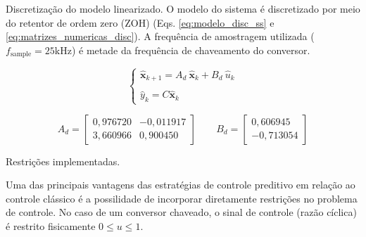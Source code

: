 \documentclass[xcolor=dvipsnames,aspectratio=169]{beamer}
\begin{document}
\begin{frame}{Discretização do modelo linearizado.}
    O modelo do sistema é discretizado por meio do retentor de ordem zero (ZOH) (Eqs. \eqref{eq:modelo_disc_ss} e \eqref{eq:matrizes_numericas_disc}). A frequência de amostragem utilizada (\(f_\mathrm{sample} = 25 \text{kHz}\)) é metade da frequência de chaveamento do conversor.

    \begin{equation}
        \begin{cases}
            \mathbf{\hat{x}}_{k+1} = A_d \ \mathbf{\hat{x}}_k + B_d \  \hat{u}_k \\ \\
            \hat{y}_k = C \mathbf{\hat{x}}_k
        \end{cases}
        \label{eq:modelo_disc_ss}
    \end{equation}

    \begin{equation}
        A_d =
        \begin{bmatrix}
            0,976720 & -0,011917 \\
            3,660966 & 0,900450
        \end{bmatrix} \qquad   B_d =
        \begin{bmatrix}
            0,606945 \\
            -0,713054
        \end{bmatrix}
        \label{eq:matrizes_numericas_disc}
    \end{equation}

\end{frame}

\begin{frame}{Restrições implementadas.}

    \justifying

    Uma das principais vantagens das estratégias de controle preditivo em relação ao controle clássico é a possilidade de incorporar diretamente restrições no problema de controle. No caso de um conversor chaveado, o sinal de controle (razão cíclica) é restrito fisicamente \(0 \leq u \leq 1\).

\end{frame}
\end{document}
